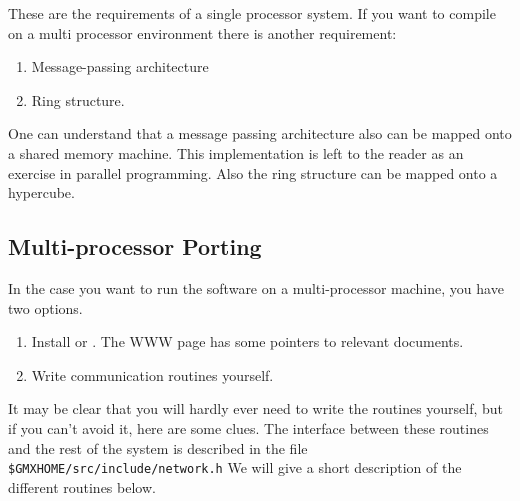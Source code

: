 These are the requirements of a single processor system. If you want
to compile {\gromacs} on a multi processor environment there is another
requirement:

\begin{enumerate}
\item Message-passing architecture
\item Ring structure.
\end{enumerate}

One can understand that a message passing architecture also can be
mapped onto a shared memory machine. This implementation is left to
the reader as an exercise in parallel programming. Also the ring
structure can be mapped onto {\eg} a hypercube.

\subsection{Multi-processor Porting}

In the case you want to run the {\gromacs} software on a
multi-processor machine, you have two options.
\begin{enumerate}
\item	Install  or . The {\gromacs} WWW
	page has some pointers to relevant documents.
\item	Write communication routines yourself. 
\end{enumerate}

It may be clear that you will hardly ever need to write the routines
yourself, but if you can't avoid it, here are some clues.
The interface between these routines and the
rest of the {\gromacs} system is described in the file {\tt
\$GMXHOME/src/include/network.h} We will give a short description of the
different routines below.

